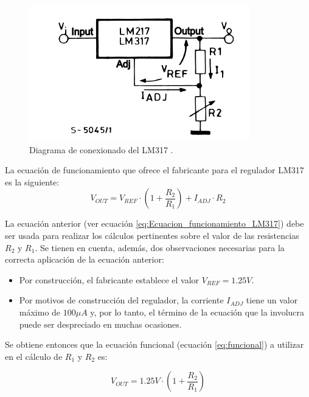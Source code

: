 \begin{figure}[H]
    \centering 
    \includegraphics[width=.6\linewidth]{pictures/LM317 conexionado.PNG}
    \caption{Diagrama de conexionado del LM317 \cite{stReguladorLM317Datasheet}.}
    \label{fig:LM317_Conexionado}
\end{figure}

La ecuación de funcionamiento que ofrece el fabricante para el regulador LM317 es la siguiente:
\begin{equation}
    V_{OUT} = V_{REF} \cdot \left( 1 + \frac{R_2}{R_1}\right) + I_{ADJ} \cdot R_2
    \label{eq:Ecuacion_funcionamiento_LM317}
\end{equation}

La ecuación anterior (ver ecuación \ref{eq:Ecuacion_funcionamiento_LM317}) debe ser usada para realizar los cálculos pertinentes sobre el valor de las resistencias $R_2$ y $R_1$. Se tienen en cuenta, además, dos observaciones necesarias para la correcta aplicación de la ecuación anterior:
\begin{itemize}
    \item Por construcción, el fabricante establece el valor $V_{REF} = 1.25V$.
    \item Por motivos de construcción del regulador, la corriente $I_{ADJ}$ tiene un valor máximo de $100 \mu A$ y, por lo tanto, el término de la ecuación que la involucra puede ser despreciado en muchas ocasiones.
\end{itemize}

Se obtiene entonces que la ecuación funcional (ecuación \ref{eq:funcional}) a utilizar en el cálculo de $R_1$ y $R_2$ es:

\begin{equation}
    V_{OUT} = 1.25V \cdot \left( 1 + \frac{R_2}{R_1}\right) 
    \label{eq:funcional}
\end{equation}

